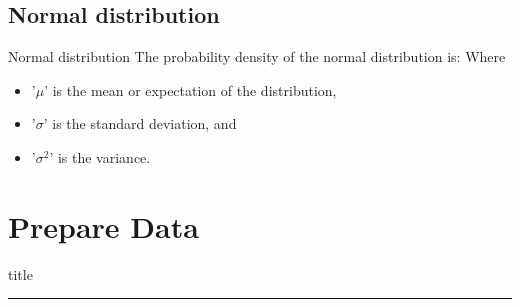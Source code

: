 \documentclass{beamer}
\begin{document}
\subsection{Normal distribution}
    \begin{frame}{Normal distribution}
        \hspace{0.5cm} The probability density of the normal distribution is:
        \hspace{0.1cm}Where
        \begin{itemize}
            \item '${\mu}$' is the mean or expectation of the distribution, \\
            \item '${\sigma}$' is the standard deviation, and \\
            \item '${\sigma^2}$' is the variance. \\
        \end{itemize}
    \end{frame}


\section{Prepare Data}
    \begin{frame}[plain]
        \vfill
      \centering
      \begin{beamercolorbox}[sep=8pt,center,shadow=true,rounded=true]{title}
        \insertsectionhead\par%
        \color{oxfordblue}\noindent\rule{10cm}{1pt} \\
        \LARGE{\faFileTextO}
      \end{beamercolorbox}
      \vfill
  \end{frame}
  
\end{document}
